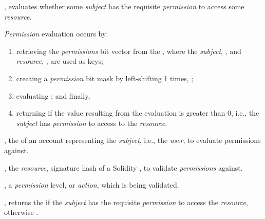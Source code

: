 \begin{code}
  \begin{functions}
    \item {},
      evaluates whether some \emph{subject} has the requisite \emph{permission}
      to access some \emph{resource}.

      \begin{displayquote}
        \emph{Permission} evaluation occurs by:
        \begin{enumerate}
          \item retrieving the \emph{permissions} bit vector from the
             , where the
            \emph{subject}, , and \emph{resource},
            , are used as keys;

          \item creating a \emph{permission} bit mask by left-shifting 1
             times, ;

          \item evaluating ; and finally,

          \item returning  if the value resulting from the evaluation
            is greater than 0, i.e., the \emph{subject} has \emph{permission} to
            access to the \emph{resource}.
        \end{enumerate}
      \end{displayquote}

      \begin{parameters}
        \item {}, the  of an account
          representing the \emph{subject}, i.e., the \emph{user}, to evaluate
          permissions against.
        \item {}, the \emph{resource}, signature hash of a
          Solidity , to validate \emph{permissions} against.
        \item {}, a \emph{permission} level, or
          \emph{action}, which is being validated.
      \end{parameters}

      \begin{returns}
        \item {}, returns the  if the
          \emph{subject} has the requisite \emph{permission} to access the
          \emph{resource}, otherwise .
      \end{returns}


\end{functions}
\end{code}
